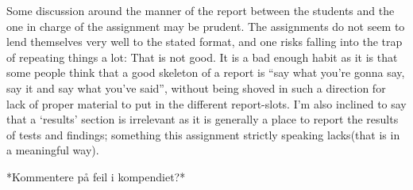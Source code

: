 Some discussion around the manner of the report between the students and the one in charge of the assignment may be prudent. The assignments do not seem to lend themselves very well to the stated format, and one risks falling into the trap of repeating things a lot: That is not good. It is a bad enough habit as it is that some people think that a good skeleton of a report is “say what you’re gonna say, say it and say what you’ve said”, without being shoved in such a direction for lack of proper material to put in the different report-slots.  I’m also inclined to say that a ‘results’ section is irrelevant as it is generally a place to report the results of tests and findings; something this assignment strictly speaking lacks(that is in a meaningful way).

*Kommentere på feil i kompendiet?*
